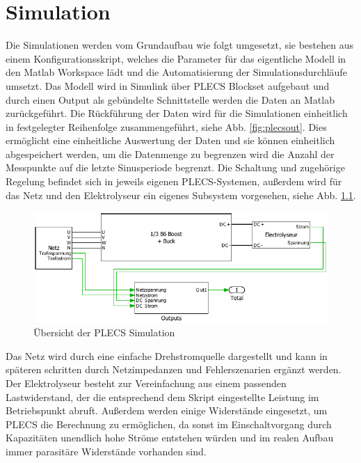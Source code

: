 \chapter{Simulation}
Die Simulationen werden vom Grundaufbau wie folgt umgesetzt, sie bestehen aus einem Konfigurationsskript, welches die Parameter für das eigentliche Modell in den Matlab Workspace lädt und die Automatisierung der Simulationsdurchläufe umsetzt. Das Modell wird in Simulink über PLECS Blockset aufgebaut und durch einen Output als gebündelte Schnittstelle werden die Daten an Matlab zurückgeführt. Die Rückführung der Daten wird für die Simulationen einheitlich in festgelegter Reihenfolge zusammengeführt, siehe Abb. \ref{fig:plecsout}. Dies ermöglicht eine einheitliche Auswertung der Daten und sie können einheitlich abgespeichert werden, um die Datenmenge zu begrenzen wird die Anzahl der Messpunkte auf die letzte Sinusperiode begrenzt. Die Schaltung und zugehörige Regelung befindet sich in jeweils eigenen PLECS-Systemen, außerdem wird für das Netz und den Elektrolyseur ein eigenes Subsystem vorgesehen, siehe Abb. \ref{fig:plecssimulationsaufbau}.  
\begin{figure}[H]
\centering
\includegraphics[width=0.9\linewidth]{content/Grafiken/PLECS_Simulationsaufbau}
\caption[Übersicht der PLECS Simulation]{Übersicht der PLECS Simulation}
\label{fig:plecssimulationsaufbau}
\end{figure}
Das Netz wird durch eine einfache Drehstromquelle dargestellt und kann in späteren schritten durch Netzimpedanzen und Fehlerszenarien ergänzt werden. Der Elektrolyseur besteht zur Vereinfachung aus einem passenden Lastwiderstand, der die entsprechend dem Skript eingestellte Leistung im Betriebspunkt abruft. Außerdem werden einige Widerstände eingesetzt, um \gls{PLECS} die Berechnung zu ermöglichen, da sonst im Einschaltvorgang durch Kapazitäten unendlich hohe Ströme entstehen würden und im realen Aufbau immer parasitäre Widerstände vorhanden sind.
